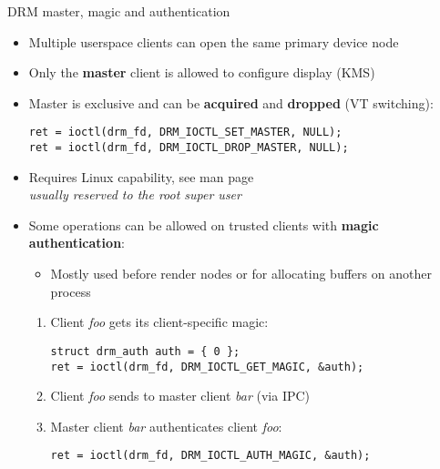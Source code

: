 \begin{frame}[fragile]{DRM master, magic and authentication}
  \begin{itemize}
  \item Multiple userspace clients can open the same primary device node
  \item Only the \textbf{master} client is allowed to configure display (KMS)
  \item Master is exclusive and can be \textbf{acquired} and \textbf{dropped} (VT switching):
  \begin{verbatim}
ret = ioctl(drm_fd, DRM_IOCTL_SET_MASTER, NULL);
ret = ioctl(drm_fd, DRM_IOCTL_DROP_MASTER, NULL);
  \end{verbatim}
  \item Requires  Linux capability, see  man page\\
    \textit{usually reserved to the root super user}
  \item Some operations can be allowed on trusted clients with \textbf{magic authentication}:
    \begin{itemize}
      \item Mostly used before render nodes or for allocating buffers on another process
    \end{itemize}
  \begin{enumerate}
  \item Client \textit{foo} gets its client-specific magic:
  \begin{verbatim}
struct drm_auth auth = { 0 };
ret = ioctl(drm_fd, DRM_IOCTL_GET_MAGIC, &auth);
  \end{verbatim}
  \item Client \textit{foo} sends  to master client \textit{bar} (via IPC)
  \item Master client \textit{bar} authenticates client \textit{foo}:
  \begin{verbatim}
ret = ioctl(drm_fd, DRM_IOCTL_AUTH_MAGIC, &auth);
  \end{verbatim}
  \end{enumerate}
  \end{itemize}
\end{frame}

